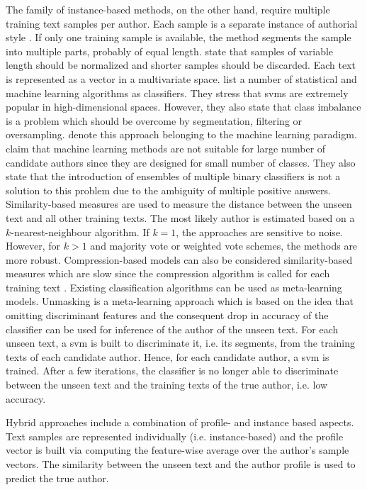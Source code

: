 The family of instance-based methods, on the other hand, require multiple training text samples per author. 
Each sample is a separate instance of authorial style \cite{stamatatos_survey_2009,altakrori_topic_2021,elmanarelbouanani_authorship_2014,neal_surveying_2018}.
If only one training sample is available, the method segments the sample into multiple parts, probably of equal length.
\citet{stamatatos_survey_2009} state that samples of variable length should be normalized and 
shorter samples should be discarded.
Each text is represented as a vector in a multivariate space.
\citet{stamatatos_survey_2009} list a number of statistical and machine learning algorithms as classifiers.
They stress that \acp{svm} are extremely popular in high-dimensional spaces.
However, they also state that class imbalance is a problem 
which should be overcome by segmentation, filtering or oversampling.
\citet{koppel_authorship_2011,koppel_determining_2014} denote this approach belonging to the machine learning paradigm.
\citet{koppel_determining_2014} claim that machine learning methods are not suitable for large number of candidate authors 
since they are designed for small number of classes. 
They also state that the introduction of ensembles of multiple binary classifiers is not a solution to this problem 
due to the ambiguity of multiple positive answers.
Similarity-based measures are used to measure the distance between the unseen text and all other training texts.
The most likely author is estimated based on a $k$-nearest-neighbour algorithm.
If $k=1$, the approaches are sensitive to noise.
However, for $k>1$ and majority vote or weighted vote schemes, the methods are more robust.
Compression-based models can also be considered similarity-based measures which are slow 
since the compression algorithm is called for each training text \cite{stamatatos_survey_2009,neal_surveying_2018}.
Existing classification algorithms can be used as meta-learning models.
Unmasking is a meta-learning approach which is based on the idea that
omitting discriminant features and the consequent drop in accuracy of the classifier 
can be used for inference of the author of the unseen text.
For each unseen text, a \ac{svm} is built to discriminate it, i.e. its segments, 
from the training texts of each candidate author.
Hence, for each candidate author, a \ac{svm} is trained.
After a few iterations, the classifier is no longer able to discriminate between the unseen text and 
the training texts of the true author, i.e. low accuracy.


Hybrid approaches include a combination of profile- and instance based aspects.
Text samples are represented individually (i.e. instance-based) and 
the profile vector is built via computing the feature-wise average over the author's sample vectors.
The similarity between the unseen text and the author profile is used to predict the true author.
